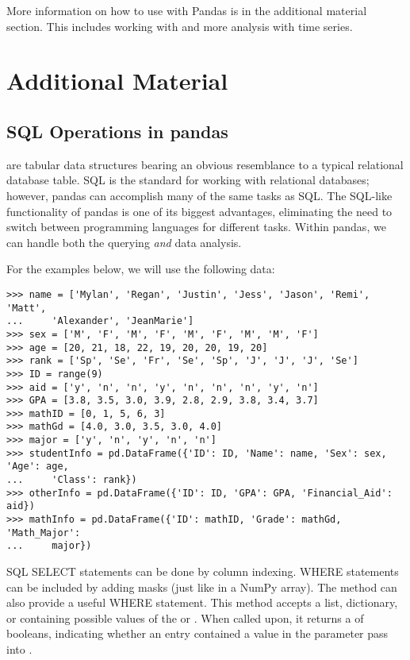 More information on how to use  with Pandas is in the additional material section. 
This includes working with  and more analysis with time series.
\pagebreak

\section*{Additional Material}
\subsection*{SQL Operations in pandas} %

 are tabular data structures bearing an obvious resemblance to a typical relational
database table.
SQL is the standard for working with relational databases; however, pandas can accomplish many of the same tasks as SQL.
The SQL-like functionality of pandas is
one of its biggest advantages, eliminating the need to switch between programming languages
for different tasks.
Within pandas, we can handle both the querying \emph{and} data analysis.

For the examples below, we will use the following data:
\begin{lstlisting}
>>> name = ['Mylan', 'Regan', 'Justin', 'Jess', 'Jason', 'Remi', 'Matt',
...		'Alexander', 'JeanMarie']
>>> sex = ['M', 'F', 'M', 'F', 'M', 'F', 'M', 'M', 'F']
>>> age = [20, 21, 18, 22, 19, 20, 20, 19, 20]
>>> rank = ['Sp', 'Se', 'Fr', 'Se', 'Sp', 'J', 'J', 'J', 'Se']
>>> ID = range(9)
>>> aid = ['y', 'n', 'n', 'y', 'n', 'n', 'n', 'y', 'n']
>>> GPA = [3.8, 3.5, 3.0, 3.9, 2.8, 2.9, 3.8, 3.4, 3.7]
>>> mathID = [0, 1, 5, 6, 3]
>>> mathGd = [4.0, 3.0, 3.5, 3.0, 4.0]
>>> major = ['y', 'n', 'y', 'n', 'n']
>>> studentInfo = pd.DataFrame({'ID': ID, 'Name': name, 'Sex': sex, 'Age': age, 
...		'Class': rank})
>>> otherInfo = pd.DataFrame({'ID': ID, 'GPA': GPA, 'Financial_Aid': aid})
>>> mathInfo = pd.DataFrame({'ID': mathID, 'Grade': mathGd, 'Math_Major': 
...		major})
\end{lstlisting}

SQL SELECT statements can be done by column indexing.
WHERE statements can be included by adding masks (just like in a NumPy array).
The method  can also provide a useful WHERE statement.
This method accepts a list, dictionary, or  containing possible values of the  or .
When called upon, it returns a  of booleans, indicating whether an entry contained a value in the parameter pass into .


